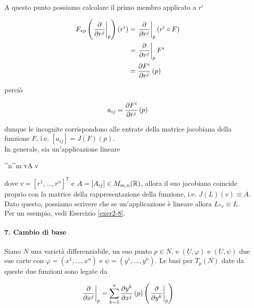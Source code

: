 A questo punto possiamo calcolare il primo membro applicato a $ r^{i} $

\begin{align}
	\begin{split}
		F_{*p} \left( \eval{ \pdv{r^{j}} }_{p} \right) (r^{i}) &= \eval{ \pdv{r^{j}} }_{p} (r^{i} \circ F) \\
		&= \eval{ \pdv{r^{j}} }_{p} F^{i} \\
		&= \pdv{F^{i}}{r^{j}} \, (p)
	\end{split}
\end{align}

perciò

\begin{equation}
	a_{ij} = \pdv{F^{i}}{r^{j}} \, (p)
\end{equation}

dunque le incognite corrispondono alle entrate della matrice jacobiana della funzione $ F $, i.e. $ [a_{ij}] = J(F)(p) $. \\
In generale, sia un'applicazione lineare

	{\R^{n}}{\R^{m}}
	{v}{A v}

dove $ v = [r^{1},\dots,r^{n}]^{T} $ e $ A = [A_{ij}] \in M_{m,n}(\mathbb{R}) $, allora il suo jacobiano coincide proprio con la matrice della rappresentazione della funzione, i.e. $ J(L)(v) \equiv A $. Dato questo, possiamo scrivere che se un'applicazione è lineare allora $ L_{*v} \equiv L $. \\
Per un esempio, vedi Esercizio \ref{exer2-8}.

\paragraph{7. Cambio di base}

Siano $ N $ una varietà differenziabile, un suo punto $ p \in N $, e $ (U,\varphi) $ e $ (U,\psi) $ due sue carte con $ \varphi = (x^{1},\dots,x^{n}) $ e $ \psi = (y^{1},\dots,y^{n}) $. Le basi per $ T_{p}(N) $ date da queste due funzioni sono legate da

\begin{equation}
	\eval{ \pdv{x^{j}} }_{p} = \sum_{k=1}^{n} \pdv{y^{k}}{x^{j}} \, (p) \left( \eval{ \pdv{y^{k}} }_{p} \right)
\end{equation}

